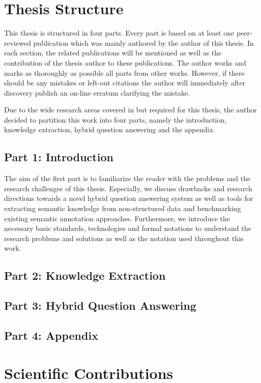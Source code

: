 \section{Thesis Structure}

This thesis is structured in four parts.
Every part is based on at least one peer-reviewed publication which was mainly authored by the author of this thesis.
In each section, the related publications will be mentioned as well as the contribution of the thesis author to these publications. 
The author works and marks as thoroughly as possible all parts from other works. 
However, if there should be any mistakes or left-out citations the author will immediately after discovery publish an on-line erratum clarifying the mistake. 

Due to the wide research areas covered in but required for this thesis, the author decided to partition this work into four parts, namely the introduction, knowledge extraction, hybrid question answering and the appendix. 

\subsection{Part 1: Introduction}
The aim of the first part is to familiarize the reader with the problems and the research challenges of this thesis. 
Especially, we discuss drawbacks and research directions towards a novel hybrid question answering system as well as tools for extracting semantic knowledge from non-structured data and benchmarking existing semantic annotation approaches.
Furthermore, we introduce the necessary basic standards, technologies and formal notations to understand the research problems and solutions as well as the notation used throughout this work.

\subsection{Part 2: Knowledge Extraction}



\subsection{Part 3: Hybrid Question Answering}

\subsection{Part 4: Appendix}


\section{Scientific Contributions}


